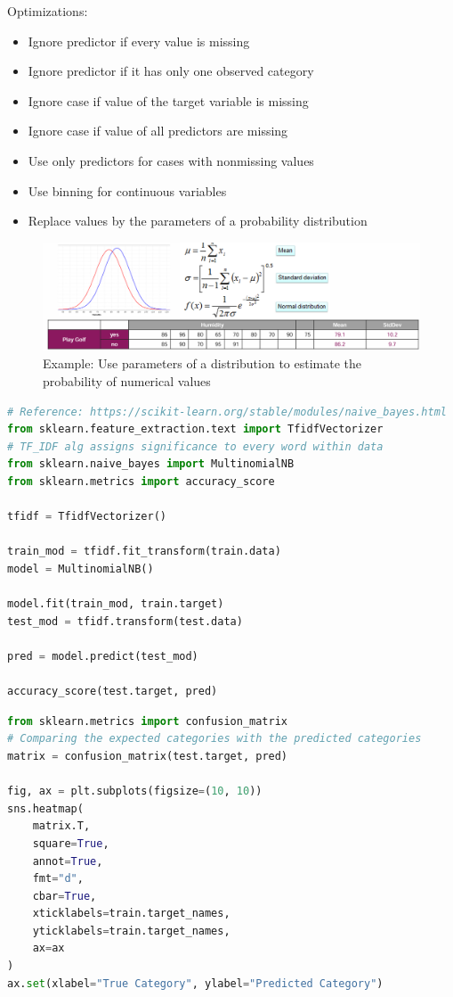 \documentclass[../Main.tex]{subfiles}
\begin{document}
Optimizations:
\begin{itemize}
    \item Ignore predictor if every value is missing
    \item Ignore predictor if it has only one observed category
    \item Ignore case if value of the target variable is missing
    \item Ignore case if value of all predictors are missing
    \item Use only predictors for cases with nonmissing values
    \item Use binning for continuous variables
    \item Replace values by the parameters of a probability distribution
\end{itemize}
\begin{figure}[H]
    \centering
    \includegraphics[width=0.75\linewidth]{Images/datan/naive-bayes-pd-replacement.png}
    \caption{Example: Use parameters of a distribution to estimate the probability of numerical values}
\end{figure}

\begin{lstlisting}[language=Python]
# Reference: https://scikit-learn.org/stable/modules/naive_bayes.html
from sklearn.feature_extraction.text import TfidfVectorizer 
# TF_IDF alg assigns significance to every word within data
from sklearn.naive_bayes import MultinomialNB
from sklearn.metrics import accuracy_score

tfidf = TfidfVectorizer()

train_mod = tfidf.fit_transform(train.data)
model = MultinomialNB()

model.fit(train_mod, train.target)
test_mod = tfidf.transform(test.data)

pred = model.predict(test_mod)

accuracy_score(test.target, pred)
\end{lstlisting}

\begin{lstlisting}[language=Python]
from sklearn.metrics import confusion_matrix
# Comparing the expected categories with the predicted categories
matrix = confusion_matrix(test.target, pred)

fig, ax = plt.subplots(figsize=(10, 10))
sns.heatmap(
    matrix.T,
    square=True,
    annot=True,
    fmt="d",
    cbar=True,
    xticklabels=train.target_names,
    yticklabels=train.target_names,
    ax=ax
)
ax.set(xlabel="True Category", ylabel="Predicted Category")
\end{lstlisting}
\end{document}
